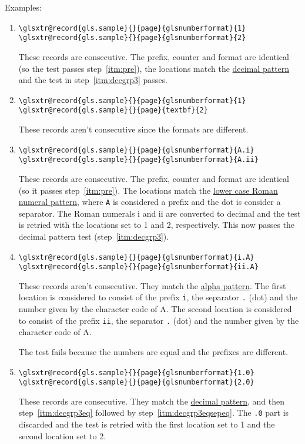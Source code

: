 \documentclass[titlepage=false,index=totoc]{scrreprt}
\begin{document}
Examples:
\begin{enumerate}
\item
\begin{verbatim}
\glsxtr@record{gls.sample}{}{page}{glsnumberformat}{1}
\glsxtr@record{gls.sample}{}{page}{glsnumberformat}{2}
\end{verbatim}
These records are consecutive. The prefix, counter and format are
identical (so the test passes step~\ref{itm:pre}), the locations match
the \hyperref[itm:decmatch]{decimal pattern} and the test in
step~\ref{itm:decgrp3} passes.

\item
\begin{verbatim}
\glsxtr@record{gls.sample}{}{page}{glsnumberformat}{1}
\glsxtr@record{gls.sample}{}{page}{textbf}{2}
\end{verbatim}
These records aren't consecutive since the formats are different.

\item
\begin{verbatim}
\glsxtr@record{gls.sample}{}{page}{glsnumberformat}{A.i}
\glsxtr@record{gls.sample}{}{page}{glsnumberformat}{A.ii}
\end{verbatim}
These records are consecutive. The prefix, counter and format are
identical (so it passes step~\ref{itm:pre}). The locations match
the \hyperref[itm:rommatch]{lower case Roman numeral pattern}, where
\texttt{A} is considered a prefix and the dot is consider a
separator. The Roman numerals i and ii are converted to decimal and
the test is retried with the locations set to 1 and 2, respectively.
This now passes the decimal pattern test (step~\ref{itm:decgrp3}).

\item
\begin{verbatim}
\glsxtr@record{gls.sample}{}{page}{glsnumberformat}{i.A}
\glsxtr@record{gls.sample}{}{page}{glsnumberformat}{ii.A}
\end{verbatim}
These records aren't consecutive. They match the
\hyperref[itm:alphmatch]{alpha pattern}. The first location is
considered to consist of the prefix \texttt{i}, the separator
\texttt{.} (dot) and the number given by the character code of A. 
The second location is considered to consist of the prefix
\texttt{ii}, the separator \texttt{.} (dot) and the number 
given by the character code of A.

The test fails because the numbers are equal and the prefixes are
different.

\item
\begin{verbatim}
\glsxtr@record{gls.sample}{}{page}{glsnumberformat}{1.0}
\glsxtr@record{gls.sample}{}{page}{glsnumberformat}{2.0}
\end{verbatim}
These records are consecutive. They match the \hyperref[itm:decmatch]{decimal
pattern}, and then step~\ref{itm:decgrp3eq} followed by
step~\ref{itm:decgrp3eqsepeq}. The \texttt{.0} part is discarded and
the test is retried with the first location set to 1 and the second
location set to 2.


\end{enumerate}
\end{document}
